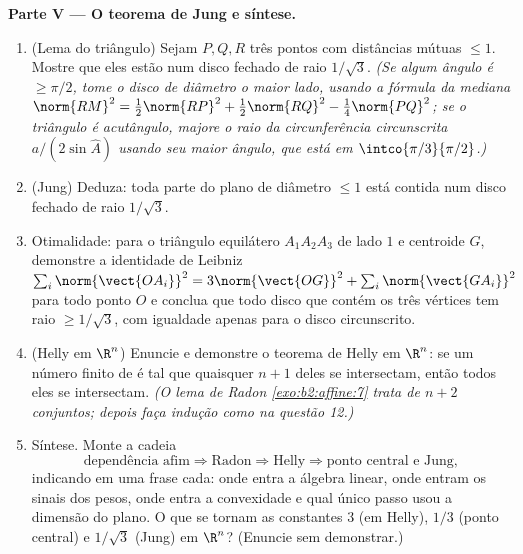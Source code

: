 \begin{problem}
\medskip
\noindent\textbf{Parte V --- O teorema de Jung e síntese.}
\begin{enumerate}[resume]
  \item (Lema do triângulo) Sejam $P, Q, R$ três pontos com
        distâncias mútuas $\leq 1$. Mostre que eles estão num
        disco fechado de raio $1/\sqrt3$. \emph{(Se algum
        ângulo é $\geq \pi/2$, tome o disco de diâmetro o maior
        lado, usando a fórmula da mediana
        $\norm{RM}^2 = \tfrac12\norm{RP}^2 +
        \tfrac12\norm{RQ}^2 - \tfrac14\norm{PQ}^2$; se o
        triângulo é acutângulo, majore o raio da circunferência circunscrita $a/(2\sin
        \widehat A)$ usando seu maior ângulo, que está em
        $\intco{\pi/3}{\pi/2}$.)}
  \item (Jung) Deduza: toda parte  do plano de
        diâmetro $\leq 1$ está contida num disco fechado de
        raio $1/\sqrt3$.
  \item Otimalidade: para o triângulo equilátero $A_1A_2A_3$
        de lado $1$ e centroide $G$, demonstre a identidade
        de Leibniz $\sum_i \norm{\vect{OA_i}}^2 =
        3\norm{\vect{OG}}^2 + \sum_i \norm{\vect{GA_i}}^2$
        para todo ponto $O$ e conclua que todo disco
        que contém os três vértices tem raio $\geq
        1/\sqrt3$, com igualdade apenas para o disco circunscrito.
  \item (Helly em $\R^n$) Enuncie e demonstre o teorema de Helly em
        $\R^n$: se um número finito de  é tal que
        quaisquer $n + 1$ deles se intersectam, então todos eles
        se intersectam. \emph{(O lema de Radon
        \cref{exo:b2:affine:7} trata de $n + 2$ conjuntos; depois
        faça indução como na questão 12.)}
  \item Síntese. Monte a cadeia
        \[
        \text{dependência afim} \Rightarrow \text{Radon}
        \Rightarrow \text{Helly} \Rightarrow
        \text{ponto central e Jung},
        \]
        indicando em uma frase cada: onde entra a álgebra linear,
        onde entram os sinais dos pesos, onde entra a
        convexidade e qual único passo usou a
        dimensão do plano. O que se tornam as constantes $3$ (em
        Helly), $1/3$ (ponto central) e $1/\sqrt3$ (Jung)
        em $\R^n$? (Enuncie sem demonstrar.)
\end{enumerate}
\end{problem}
